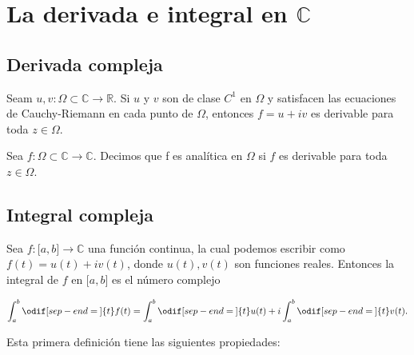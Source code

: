 \documentclass[digital]{fc-hw-template}
\title{}
\author{Marcos López Merino}
\begin{document}
\maketitle

\section{La derivada e integral en \(\mathbb{C}\)}
\subsection{Derivada compleja}

\begin{corollary}
    Seam \(u,v \colon \Omega \subset \mathbb{C} \to \mathbb{R}\). Si \(u\) y
    \(v\) son de clase \(C^{1}\) en \(\Omega\) y satisfacen las ecuaciones de
    Cauchy-Riemann en cada punto de \(\Omega\), entonces \(f = u + iv\) es
    derivable para toda \(z \in\Omega\).
\end{corollary}

\begin{definition}
    Sea \(f \colon \Omega \subset \mathbb{C} \to \mathbb{C}\). Decimos que f es
    analítica en \(\Omega\) si \(f\) es derivable para toda \(z \in\Omega\).
\end{definition}

\subsection{Integral compleja}

\begin{definition}
    Sea \(f \colon \bigl[a, b\bigr] \to \mathbb{C}\) una función continua, la cual
    podemos escribir como \(f(t) = u(t) + iv(t)\), donde \(u(t), v(t)\)
    son funciones
    reales. Entonces la integral de \(f\) en \(\bigl[a,b\bigr]\) es el
    número complejo

    \begin{equation}
        \int_{a}^{b}\odif[sep-end=\medspace]{t} f(t) =
        \int_{a}^{b}\odif[sep-end=\medspace]{t}
        u(t) + i \int_{a}^{b}\odif[sep-end=\medspace]{t} v(t).
    \end{equation}
\end{definition}

Esta primera definición tiene las siguientes propiedades:
\end{document}

